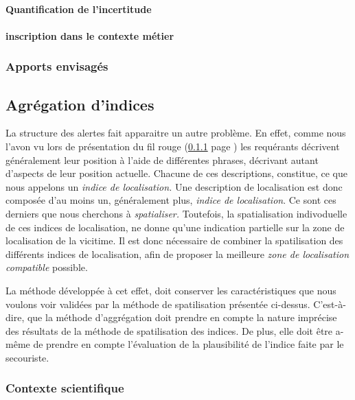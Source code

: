 \paragraph{Quantification de l'incertitude}

\paragraph{inscription dans le contexte métier}


\subsubsection{Apports envisagés}

\subsection{Agrégation d'indices}
\label{subsec:2-1-4}

La structure des alertes fait apparaitre un autre problème. En effet,
comme nous l'avon vu lors de présentation du fil rouge (\ref{} page
\pageref{} ) les
requérants décrivent généralement leur position à l'aide de
différentes phrases, décrivant autant d'aspects de leur position
actuelle. Chacune de ces descriptions, constitue, ce que nous appelons
un \emph{indice de localisation.} Une description de localisation est
donc composée d'au moins un, généralement plus, \emph{indice de
  localisation}. Ce sont ces derniers que nous cherchons à
\emph{spatialiser.} Toutefois, la spatialisation indivoduelle de ces
indices de localisation, ne donne qu'une indication partielle sur la
zone de localisation de la vicitime. Il est donc nécessaire de
combiner la spatilisation des différents indices de localisation, afin
de proposer la meilleure \emph{zone de localisation compatible}
possible.

La méthode développée à cet effet, doit conserver les caractéristiques
que nous voulons voir validées par la méthode de spatilisation
présentée ci-dessus. C'est-à-dire, que la méthode d'aggrégation doit
prendre en compte la nature imprécise des résultats de la méthode de
spatilisation des indices. De plus, elle doit être a-même de prendre
en compte l'évaluation de la plausibilité de l'indice faite par le
secouriste.

\subsubsection{Contexte scientifique}

